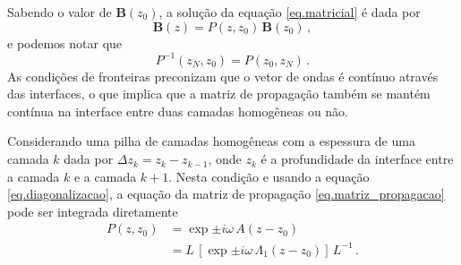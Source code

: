 Sabendo o valor de $\mathbf{B}(z_0)$, a solu\c{c}\~ao da equa\c{c}\~ao \ref{eq.matricial} \'e dada por
\begin{equation}
\mathbf{B}(z)=P(z,z_0)\,\mathbf{B}(z_0)\,,
\end{equation}
e podemos notar que 
\begin{equation}
P^{-1}(z_N,z_0)=P(z_0,z_N)\,.
\end{equation}
As condi\c{c}\~oes de fronteiras preconizam que o vetor de ondas \'e cont\'inuo atrav\'es das interfaces, o que implica que a matriz de propaga\c{c}\~ao tamb\'em se mant\'em cont\'inua na interface entre duas camadas homog\^eneas ou n\~ao.

Considerando uma pilha de camadas homog\^eneas com a espessura de uma camada $k$ dada por $\Delta z_k=z_k-z_{k-1}$, onde $z_k$ \'e a profundidade da interface entre a camada $k$ e a camada $k+1$. Nesta condi\c{c}\~ao e usando a equa\c{c}\~ao \ref{eq.diagonalizacao}, a equa\c{c}\~ao da matriz de propaga\c{c}\~ao \ref{eq.matriz_propagacao} pode ser integrada diretamente  
\begin{align*}
P(z,z_0)&=\exp{\pm i\omega\,A(z-z_0)}\\
&=L\,\left[\exp{\pm i\omega\,\Lambda_1(z-z_0)}\right]\,L^{-1}\,.
\end{align*}

